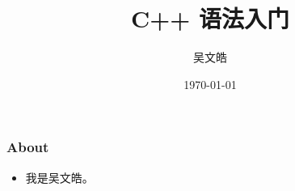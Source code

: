 \documentclass[10pt]{beamer}
\title{C++ 语法入门}
\author{吴文皓}
\institute{合肥一六八中学}
\date{\today}
\begin{document}
	\frame{\titlepage}%
	
	\begin{frame}
		\frametitle{About}
		\begin{itemize}
			\item 我是吴文皓。
			
		\end{itemize}
	\end{frame}
	
\end{document}
